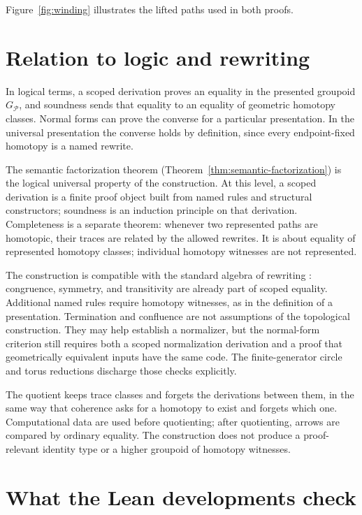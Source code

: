\documentclass[10pt,reqno]{amsart}
\theoremstyle{definition}
\theoremstyle{plain}
\theoremstyle{remark}
\begin{document}
Figure~\ref{fig:winding} illustrates the lifted paths used in both proofs.


\section{Relation to logic and rewriting}
\label{sec:logic}

In logical terms, a scoped derivation proves an equality in the presented
groupoid $G_{\mathcal P}$, and soundness sends that equality to an equality of
geometric homotopy classes.  Normal forms can prove the converse for a
particular presentation.  In the universal presentation the converse holds by
definition, since every endpoint-fixed homotopy is a named rewrite.

The semantic factorization theorem (Theorem~\ref{thm:semantic-factorization})
is the logical universal property of the construction.  At this level, a
scoped derivation is a finite proof object built from named rules and
structural constructors; soundness is an induction principle on that
derivation.  Completeness is a separate theorem: whenever two represented paths are
homotopic, their traces are related by the allowed rewrites.  It is about
equality of represented homotopy classes; individual homotopy witnesses are
not represented.

The construction is compatible with the standard algebra of rewriting
\cite{ChurchRosser36,Newman42,KnuthBendix70,Squier87,GuiraudMalbos09}:
congruence, symmetry, and transitivity are already part of scoped equality.
Additional named rules require homotopy witnesses, as in the definition of a
presentation.  Termination and confluence are not assumptions of the
topological construction.  They may help establish a normalizer, but the
normal-form criterion still requires both a scoped normalization derivation
and a proof that geometrically equivalent inputs have the same code.
The finite-generator circle and torus reductions discharge those checks
explicitly.

The quotient keeps trace classes and forgets the derivations between them,
in the same way that coherence asks for a homotopy to exist and forgets which
one.  Computational data are used before quotienting; after quotienting,
arrows are compared by ordinary equality.  The construction does not produce
a proof-relevant identity type or a higher groupoid of homotopy witnesses.

\section{What the Lean developments check}
\label{sec:formalization}
\end{document}
